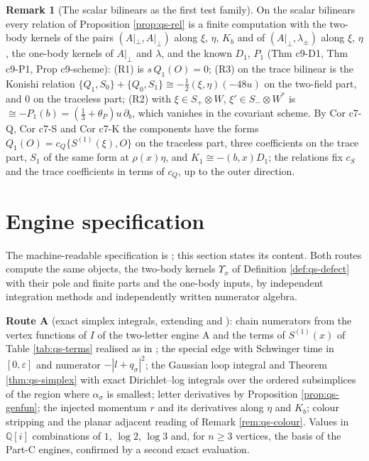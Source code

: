\documentclass[11pt]{article}
\numberwithin{equation}{section}
\theoremstyle{plain}
\theoremstyle{definition}
\newtheorem{remark}[theorem]{Remark}
\newcommand{\Ap}{A|_{\perp}}
\begin{document}
\begin{remark}[The scalar bilinears as the first test family]
\label{rem:qs-bilinears}
On the scalar bilinears every relation of Proposition \ref{prop:qs-rel} is a finite computation with the two-body kernels of the pairs $(\Ap,\Ap)$ along $\xi$, $\eta$, $K_b$ and of $(\Ap,\lambda_\pm)$ along $\xi$, $\eta$, the one-body kernels of $\Ap$ and $\lambda$, and the known $D_1$, $P_1$ (Thm c9-D1, Thm c9-P1, Prop c9-scheme): (R1) is $s\,Q_1(O)=0$; (R3) on the trace bilinear is the Konishi relation $\{Q_1,S_0\}+\{Q_0,S_1\}\cong-\tfrac12(\xi,\eta)(-48u)$ on the two-field part, and $0$ on the traceless part; (R2) with $\xi\in S_+\otimes W$, $\xi'\in S_-\otimes W^*$ is $\cong-P_1(b)=(\tfrac13+\theta_P)u\,\partial_b$, which vanishes in the covariant scheme. By Cor c7-Q, Cor c7-S and Cor c7-K the components have the forms $Q_1(O)=c_Q\{S^{(1)}(\xi),O\}$ on the traceless part, three coefficients on the trace part, $S_1$ of the same form at $\rho(x)\eta$, and $K_1\cong-(b,x)D_1$; the relations fix $c_S$ and the trace coefficients in terms of $c_Q$, up to the outer direction.
\end{remark}

\section{Engine specification}
\label{sec:qs-engines}

The machine-readable specification is ; this section states its content. Both routes compute the same objects, the two-body kernels $\Upsilon_x$ of Definition \ref{def:qs-defect} with their pole and finite parts and the one-body inputs, by independent integration methods and independently written numerator algebra.

\textbf{Route A} (exact simplex integrals, extending  and ): chain numerators from the vertex functions of $I$ of the two-letter engine A and the terms of $S^{(1)}(x)$ of Table \ref{tab:qs-terms} realised as in ; the special edge with Schwinger time in $[0,\varepsilon]$ and numerator $-|l+q_\sigma|^2$; the Gaussian loop integral and Theorem \ref{thm:qs-simplex} with exact Dirichlet--log integrals over the ordered subsimplices of the region where $\alpha_\sigma$ is smallest; letter derivatives by Proposition \ref{prop:qs-genfun}; the injected momentum $r$ and its derivatives along $\eta$ and $K_b$; colour stripping and the planar adjacent reading of Remark \ref{rem:qs-colour}. Values in $\mathbb Q[i]$ combinations of $1$, $\log2$, $\log3$ and, for $n\ge3$ vertices, the basis of the Part-C engines, confirmed by a second exact evaluation.
\end{document}
